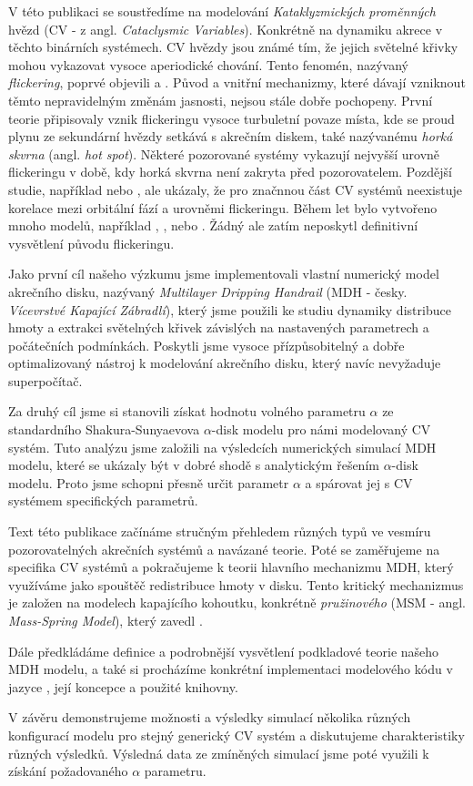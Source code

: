 V této publikaci se soustředíme na modelování \emph{Kataklyzmických proměnných} hvězd (CV - z angl. \emph{Cataclysmic Variables}). Konkrétně na dynamiku akrece v těchto binárních systémech. CV hvězdy jsou známé tím, že jejich světelné křivky mohou vykazovat vysoce aperiodické chování. Tento fenomén, nazývaný \emph{flickering}, poprvé objevili \citep{henize1949} a \citep{lenouvel1954}. Původ a vnitřní mechanizmy, které dávají vzniknout těmto nepravidelným změnám jasnosti, nejsou stále dobře pochopeny. První teorie připisovaly vznik flickeringu vysoce turbuletní povaze místa, kde se proud plynu ze sekundární hvězdy setkává s akrečním diskem, také nazývanému \emph{horká skvrna} (angl. \emph{hot spot}). Některé pozorované systémy vykazují nejvyšší urovně flickeringu v době, kdy horká skvrna není zakryta před pozorovatelem. Pozdější studie, například \citep{patterson1981} nebo \citep{wood1986}, ale ukázaly, že pro značnnou část CV systémů neexistuje  korelace mezi orbitální fází a urovněmi flickeringu. Během let bylo vytvořeno mnoho modelů, například \citep{dobrotka2012}, \citep{kley1997}, \citep{lyubarskii1997} nebo \citep{yonehara1997}. Žádný ale zatím neposkytl definitivní vysvětlení původu flickeringu.

Jako první cíl našeho výzkumu jsme implementovali vlastní numerický model akrečního disku, nazývaný \emph{Multilayer Dripping Handrail} (MDH - česky. \emph{Vícevrstvé Kapající Zábradlí}), který jsme použili ke studiu dynamiky distribuce hmoty a extrakci světelných křivek závislých na nastavených parametrech a počátečních podmínkách. Poskytli jsme vysoce přízpůsobitelný a dobře optimalizovaný nástroj k modelování akrečního disku, který navíc nevyžaduje superpočítač.

Za druhý cíl jsme si stanovili získat hodnotu volného parametru $\alpha$ ze standardního Shakura-Sunyaevova $\alpha$-disk modelu pro námi modelovaný CV systém. Tuto analýzu jsme založili na výsledcích numerických simulací MDH modelu, které se ukázaly být v dobré shodě s analytickým řešením $\alpha$-disk modelu. Proto jsme schopni přesně určit parametr $\alpha$ a spárovat jej s CV systémem specifických parametrů.

Text této publikace začínáme stručným přehledem různých typů ve vesmíru pozorovatelných akrečních systémů a navázané teorie. Poté se zaměřujeme na specifika CV systémů a pokračujeme k teorii hlavního mechanizmu MDH, který využíváme jako spouštěč redistribuce hmoty v disku. Tento kritický mechanizmus je založen na modelech kapajícího kohoutku, konkrétně \emph{pružinového} (MSM - angl. \emph{Mass-Spring Model}), který zavedl \citep{shaw1984}.

Dále předkládáme definice a podrobnější vysvětlení podkladové teorie našeho MDH modelu, a také si procházíme konkrétní implementaci modelového kódu v jazyce \CC, její koncepce a použité knihovny. 

V závěru demonstrujeme možnosti a výsledky simulací několika různých konfigurací modelu pro stejný generický CV systém a diskutujeme charakteristiky různých výsledků. Výsledná data ze zmíněných simulací jsme poté využili k získání požadovaného $\alpha$ parametru.
